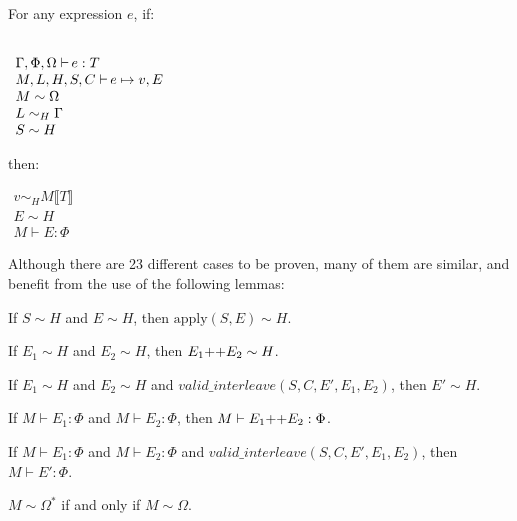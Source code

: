 \begin{thm}
For any expression $e$, if:
\begin{center}
$
\begin{array}{l} \\
\typeenv{e}{T} \\
\opsenv{e}{v}{E} \\
M \sim \Omega \\
L \sim_H \Gamma \\
S \sim H
\end{array}
$
\end{center}
then:
\begin{center}
$
\begin{array}{l}
v \sim_H M \llbracket T \rrbracket \\
E \sim H \\
M \vdash E : \Phi
\end{array}
$
\end{center}
\end{thm}

Although there are 23 different cases to be proven, many of them are similar, and benefit from
the use of the following lemmas:

\begin{lem}
\label{lemma:heapconst:apply}
If $S \sim H$ and $E \sim H$, then $\text{apply}(S, E) \sim H$.
\end{lem}

\begin{lem}
\label{lemma:heapconst:effects1}
If $E_1 \sim H$ and $E_2 \sim H$, then $E_1 \text{++} E_2 \sim H$.
\end{lem}

\begin{lem}
\label{lemma:heapconst:effects2}
If $E_1 \sim H$ and $E_2 \sim H$ and $valid\_interleave(S, C, E', E_1, E_2)$, then $E' \sim H$.
\end{lem}

\begin{lem}
\label{lemma:effsound:effects1}
If $M \vdash E_1 : \Phi$ and $M \vdash E_2 : \Phi$, then $M \vdash E_1 \text{++} E_2 : \Phi$.
\end{lem}

\begin{lem}
\label{lemma:effsound:effects2}
If $M \vdash E_1 : \Phi$ and $M \vdash E_2 : \Phi$ and $valid\_interleave(S, C, E', E_1, E_2)$, then $M \vdash E' : \Phi$.
\end{lem}

\begin{lem}
\label{lemma:omegaclosure}
$M \sim \Omega^*$ if and only if $M \sim \Omega$.
\end{lem}

